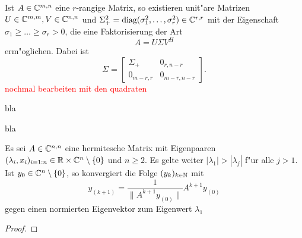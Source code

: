 \begin{thm}\label{thm:svd}
Ist $A\in\mathbb{C}^{m,n}$ eine $r$-rangige Matrix, so existieren unit"are Matrizen $U\in\mathbb{C}^{m,m}, V\in\mathbb{C}^{n,n}$
und $\Sigma^2_+ =\text{diag}(\sigma^2_1,\ldots,\sigma^2_r)\in\mathbb{C}^{r,r}$ mit der Eigenschaft $\sigma_1 \ge \ldots \ge \sigma_r > 0$, die
eine Faktorisierung der Art
\[
A = U \Sigma V^H
\]
erm"oglichen. Dabei ist
\[
\Sigma = \begin{bmatrix} \Sigma_+ & 0_{r,n-r} \\
0_{m-r,r} & 0_{m-r,n-r} \end{bmatrix}.
\]
\textcolor{red}{nochmal bearbeiten mit den quadraten}

\end{thm}

\begin{thm}\label{thm:appTheorems:Spektralsatz}
bla
\end{thm}

\begin{thm}\label{thm:appTheorems:Cholesky}
bla
\end{thm}

\begin{thm} Es sei $A\in\mathbb{C}^{n,n}$ eine hermitesche Matrix mit Eigenpaaren $(\lambda_i,x_i)_{i=1:n} \in \mathbb{R}\times\mathbb{C}^n \setminus\{0\}$ und $n\ge 2$.
Es gelte weiter $|\lambda_1| > |\lambda_j|$ f"ur alle
$j > 1$. Ist $y_0 \in\mathbb{C}^n \setminus\{0\}$, so konvergiert die Folge
$(y_k)_{k\in\mathbb{N}}$ mit
\[
y_{(k+1)} = \frac{1}{\|A^{k+1} y_{(0)}\|} A^{k+1}y_{(0)}
\]
gegen einen normierten Eigenvektor zum Eigenwert $\lambda_1$
\end{thm}

\begin{proof}

\end{proof}
